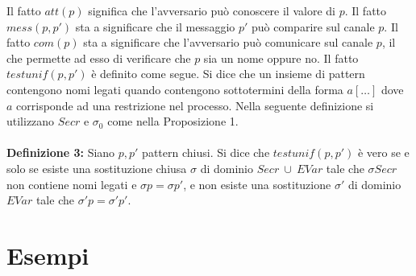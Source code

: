 \documentclass[12pt]{report}
\begin{document}
Il fatto $att(p)$ significa che l'avversario può conoscere il valore di $p$. Il fatto $mess(p,p')$ sta a significare che il messaggio $p'$ può comparire sul canale $p$. Il fatto $com(p)$ sta a significare che l'avversario può comunicare sul canale $p$, il che permette ad esso di verificare che $p$ sia un nome oppure no. Il fatto $testunif(p,p')$ è definito come segue. Si dice che un insieme di pattern contengono nomi legati quando contengono sottotermini della forma $a[\dots]$ dove $a$ corrisponde ad una restrizione nel processo. Nella seguente definizione si utilizzano $Secr$ e $\sigma_0$ come nella Proposizione 1.\\
\\
\textbf{Definizione 3:} Siano $p,p'$ pattern chiusi. Si dice che $testunif(p,p')$ è vero se e solo se esiste una sostituzione chiusa $\sigma$ di dominio $Secr\ \cup \ EVar $ tale che $\sigma Secr$ non contiene nomi legati e $\sigma p = \sigma p'$, e non esiste una sostituzione $\sigma'$ di dominio $EVar$ tale che $\sigma' p = \sigma' p'$.
\section*{Esempi}
\end{document}

